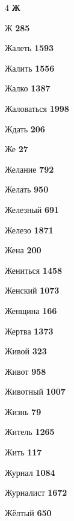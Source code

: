 \begin{multicols}{4}
\vspace{0.6em}\noindent\textbf{\normalsize\sffamily\color{primary} Ж}\par\vspace{0.2em}
\noindent Ж \dotfill \textbf{\color{secondary} 285}\par
\noindent Жалеть \dotfill \textbf{\color{secondary} 1593}\par
\noindent Жалить \dotfill \textbf{\color{secondary} 1556}\par
\noindent Жалко \dotfill \textbf{\color{secondary} 1387}\par
\noindent Жаловаться \dotfill \textbf{\color{secondary} 1998}\par
\noindent Ждать \dotfill \textbf{\color{secondary} 206}\par
\noindent Же \dotfill \textbf{\color{secondary} 27}\par
\noindent Желание \dotfill \textbf{\color{secondary} 792}\par
\noindent Желать \dotfill \textbf{\color{secondary} 950}\par
\noindent Железный \dotfill \textbf{\color{secondary} 691}\par
\noindent Железо \dotfill \textbf{\color{secondary} 1871}\par
\noindent Жена \dotfill \textbf{\color{secondary} 200}\par
\noindent Жениться \dotfill \textbf{\color{secondary} 1458}\par
\noindent Женский \dotfill \textbf{\color{secondary} 1073}\par
\noindent Женщина \dotfill \textbf{\color{secondary} 166}\par
\noindent Жертва \dotfill \textbf{\color{secondary} 1373}\par
\noindent Живой \dotfill \textbf{\color{secondary} 323}\par
\noindent Живот \dotfill \textbf{\color{secondary} 958}\par
\noindent Животный \dotfill \textbf{\color{secondary} 1007}\par
\noindent Жизнь \dotfill \textbf{\color{secondary} 79}\par
\noindent Житель \dotfill \textbf{\color{secondary} 1265}\par
\noindent Жить \dotfill \textbf{\color{secondary} 117}\par
\noindent Журнал \dotfill \textbf{\color{secondary} 1084}\par
\noindent Журналист \dotfill \textbf{\color{secondary} 1672}\par
\noindent Жёлтый \dotfill \textbf{\color{secondary} 650}\par


\end{multicols}
